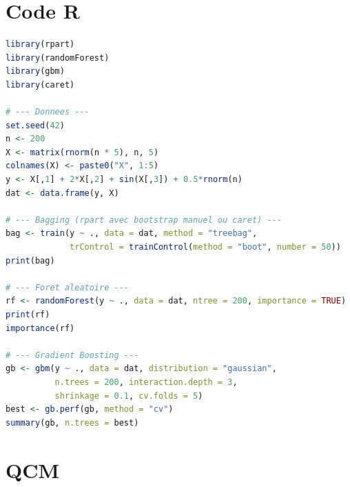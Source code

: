 \documentclass[a4paper,11pt]{article}
\begin{document}
\newpage

\section{Code R}

\begin{lstlisting}[language=R, caption=Bagging, Forêts aléatoires, Boosting avec R]
library(rpart)
library(randomForest)
library(gbm)
library(caret)

# --- Donnees ---
set.seed(42)
n <- 200
X <- matrix(rnorm(n * 5), n, 5)
colnames(X) <- paste0("X", 1:5)
y <- X[,1] + 2*X[,2] + sin(X[,3]) + 0.5*rnorm(n)
dat <- data.frame(y, X)

# --- Bagging (rpart avec bootstrap manuel ou caret) ---
bag <- train(y ~ ., data = dat, method = "treebag",
             trControl = trainControl(method = "boot", number = 50))
print(bag)

# --- Foret aleatoire ---
rf <- randomForest(y ~ ., data = dat, ntree = 200, importance = TRUE)
print(rf)
importance(rf)

# --- Gradient Boosting ---
gb <- gbm(y ~ ., data = dat, distribution = "gaussian",
          n.trees = 200, interaction.depth = 3,
          shrinkage = 0.1, cv.folds = 5)
best <- gb.perf(gb, method = "cv")
summary(gb, n.trees = best)
\end{lstlisting}

\newpage

\section{QCM}
\end{document}
